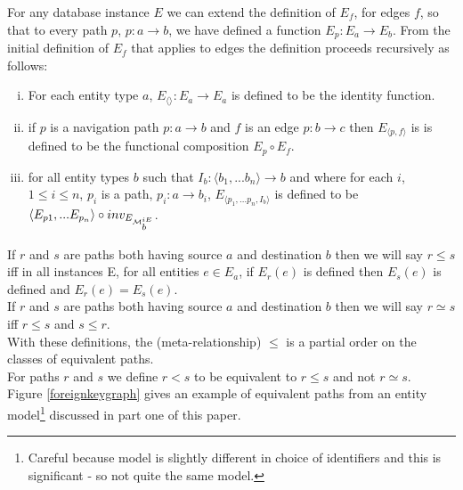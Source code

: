 \documentclass[10pt,a4paper]{article}
\newcommand{\genericmodel}{\mathcal{M}}
\newcommand{\allIdentifying}{\genericmodel^{iE}}
\newcommand{\idEdges}[1]{\allIdentifying_{\raisebox{2pt}{$\scriptstyle{#1}$}}}
\begin{document}
\noindent For any database instance $E$ we can  extend  the definition of
$E_f$, for edges $f$,  so that to every path $p$, $p: a \rightarrow b$,  we have defined a function $E_p: E_a \rightarrow E_b$. From the initial definition of $E_f$ that applies to 
edges the definition proceeds recursively as follows: 
\begin{enumerate} [(i)]
\item{  For each entity type $a$, $E_{\langle \rangle}: E_a \rightarrow E_a$ is defined to be the identity function.
}

\item{   if $p$ is a navigation path $p: a \rightarrow b$ and $f$ is an edge $p: b \rightarrow c$ then $E_{\langle p,f \rangle}$ is 
is defined to be the functional composition $E_p \circ E_f$.
}

\item{ for all entity types $b$ such that $I_b: \langle b_1,...b_n\rangle \rightarrow b$ and where
for each $i$, $1 \leq i \leq n$, $p_i$ is a path, $p_i: a \rightarrow b_i$, $E_{\langle p_1,...p_n,I_b\rangle}$ is defined to be 
$\langle E_{p1},...E_{p_n} \rangle \circ inv_{E_{\idEdges{b}}}$.
}
\end{enumerate}

\noindent If $r$ and $s$ are paths both having source $a$ and destination $b$ then we will say $r \leq s$ iff in all instances E, for all 
entities $e \in E_a$, if $E_r(e)$ is defined then $E_s(e)$ is defined and $E_r(e)=E_s(e)$. \\

\noindent If $r$ and $s$ are paths both having source $a$ and destination $b$ then we will say $r \simeq s$ iff $r \leq s$ and $s \leq r$. \\

\noindent With these definitions,  the (meta-relationship) $\leq$ is a partial order on the classes of equivalent paths. \\

\noindent For paths $r$ and $s$ we define $r < s$ to be equivalent to $r \leq s$ and not $r \simeq s$. \\

Figure \ref{foreignkeygraph} gives an example of equivalent paths from an entity model\footnote{Careful because model is slightly different in choice of identifiers and this is significant - so not quite the same model.} discussed in part one of this paper.
\end{document}
